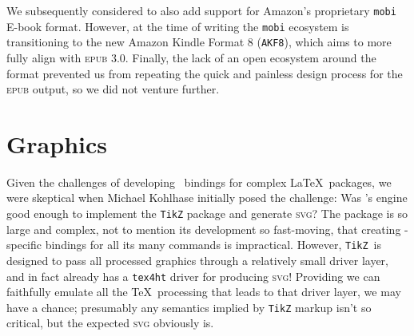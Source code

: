 \documentclass{llncs}
\def\ebook{\mbox{E-book}\xspace}
\def\epub{\textsc{epub}\xspace}
\def\svg{\textsc{svg}\xspace}
\def\tikz{\texttt{TikZ}\xspace}
\begin{document}
We subsequently considered to also add support for Amazon's proprietary \texttt{mobi} \ebook format. However, at the time of writing the \texttt{mobi} ecosystem is transitioning to the new Amazon Kindle Format 8 (\texttt{AKF8}), which aims to more fully align with \epub 3.0. Finally, the lack of an open ecosystem around the format prevented us from repeating the quick and painless design process for the \epub output, so we did not venture further.



\section{Graphics}\label{graphics}
Given the challenges of developing \LaTeXML\ bindings for complex
\LaTeX\ packages, we were skeptical when Michael Kohlhase
initially posed the challenge: Was \LaTeXML's engine good
enough to implement the \tikz package and generate \svg?
The package is so large and complex, not to mention
its development so fast-moving, that creating \LaTeXML-specific
bindings for all its many commands is impractical.  However,
\tikz\ is designed to pass all processed graphics through
a relatively small driver layer, and in fact already has
a \texttt{tex4ht} driver for producing \svg!
Providing we can faithfully emulate all the \TeX\ processing
that leads to that driver layer, we may have a chance;
presumably any semantics implied by \tikz markup isn't so critical,
but the expected \svg obviously is.
\end{document}
